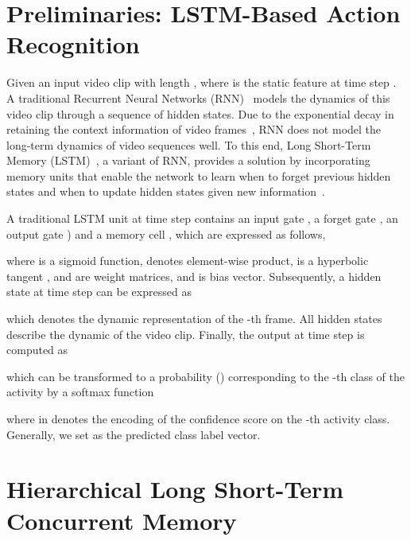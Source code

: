 \documentclass[9pt,journal,letterpaper,twocolumn]{IEEEtran}
\begin{document}
\section{Preliminaries: LSTM-Based Action Recognition}
	\label{BK}
	{ Given an input video clip  with length , where  is the static feature at time step . A traditional  Recurrent  Neural  Networks (RNN)~\cite{williams1989learning} models the dynamics of this video clip through a sequence of hidden states. Due to the exponential decay in retaining the context information of video frames~\cite{hochreiter1997long}, RNN does not model the long-term dynamics of video sequences well. To this end, Long Short-Term Memory (LSTM)~\cite{hochreiter1997long}, a variant of RNN, provides a solution by incorporating memory units that enable the network to learn when to forget previous hidden states and when to update hidden states given new information~\cite{donahue2015long}. 



		A traditional  LSTM unit\cite{hochreiter1997long} at time step  contains an input gate , a forget gate , an output gate ) and a memory cell , which are expressed as follows,
		
		
		
		
		
		where  is a sigmoid function,  denotes element-wise product,  is a hyperbolic tangent ,  and  are weight matrices, and  is bias vector.
Subsequently, a hidden state  at time step  can be expressed as
		
		which denotes the dynamic representation of the -th frame. All hidden states  describe the dynamic of the video clip.
		Finally, the output  at time step  is computed as
		
		which  can be transformed to a probability  () corresponding to the -th class of the activity by a softmax function
		
		where  in  denotes the encoding of the confidence score on the -th activity class. Generally, we set  as the predicted class label vector.
	}
	


	
	
	
	\section{Hierarchical Long Short-Term Concurrent Memory}
	\label{PRO}
\end{document}
